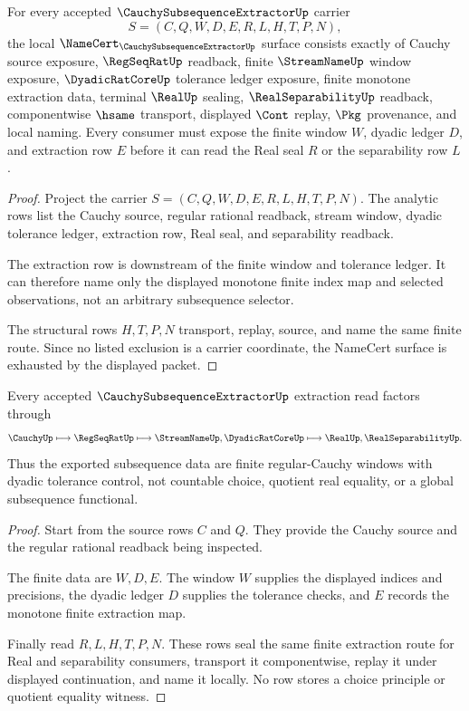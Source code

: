 \begin{theorem}
\label{thm:cauchy-subsequence-extractor-namecert-obligations}
For every accepted $\CauchySubsequenceExtractorUp$ carrier
$$
S=(C,Q,W,D,E,R,L,H,T,P,N),
$$
the local $\NameCert_{\CauchySubsequenceExtractorUp}$ surface consists exactly of Cauchy source exposure, $\RegSeqRatUp$ readback, finite $\StreamNameUp$ window exposure, $\DyadicRatCoreUp$ tolerance ledger exposure, finite monotone extraction data, terminal $\RealUp$ sealing, $\RealSeparabilityUp$ readback, componentwise $\hsame$ transport, displayed $\Cont$ replay, $\Pkg$ provenance, and local naming. Every consumer must expose the finite window $W$, dyadic ledger $D$, and extraction row $E$ before it can read the Real seal $R$ or the separability row $L$.
\end{theorem}
\begin{proof}
Project the carrier $S=(C,Q,W,D,E,R,L,H,T,P,N)$. The analytic rows list the Cauchy source, regular rational readback, stream window, dyadic tolerance ledger, extraction row, Real seal, and separability readback.

The extraction row is downstream of the finite window and tolerance ledger. It can therefore name only the displayed monotone finite index map and selected observations, not an arbitrary subsequence selector.

The structural rows $H,T,P,N$ transport, replay, source, and name the same finite route. Since no listed exclusion is a carrier coordinate, the NameCert surface is exhausted by the displayed packet.
\end{proof}

\begin{theorem}
\label{thm:cauchy-subsequence-extractor-finite-window-route}
Every accepted $\CauchySubsequenceExtractorUp$ extraction read factors through
$$
\CauchyUp \longmapsto \RegSeqRatUp \longmapsto \StreamNameUp,\DyadicRatCoreUp \longmapsto \RealUp,\RealSeparabilityUp .
$$
Thus the exported subsequence data are finite regular-Cauchy windows with dyadic tolerance control, not countable choice, quotient real equality, or a global subsequence functional.
\end{theorem}
\begin{proof}
Start from the source rows $C$ and $Q$. They provide the Cauchy source and the regular rational readback being inspected.

The finite data are $W,D,E$. The window $W$ supplies the displayed indices and precisions, the dyadic ledger $D$ supplies the tolerance checks, and $E$ records the monotone finite extraction map.

Finally read $R,L,H,T,P,N$. These rows seal the same finite extraction route for Real and separability consumers, transport it componentwise, replay it under displayed continuation, and name it locally. No row stores a choice principle or quotient equality witness.
\end{proof}

